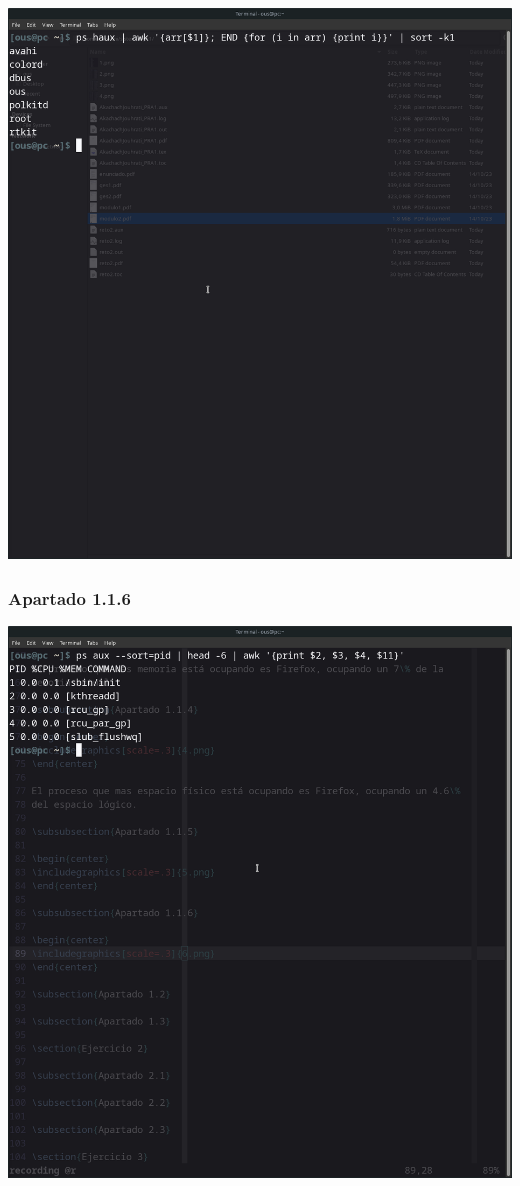 \documentclass[spanish]{article}
\begin{document}
\begin{center}
\includegraphics[scale=.3]{../img/5.png}
\end{center}

\newpage

\subsubsection{Apartado 1.1.6}

\begin{center}
\includegraphics[scale=.3]{../img/6.png}
\end{center}
\end{document}
